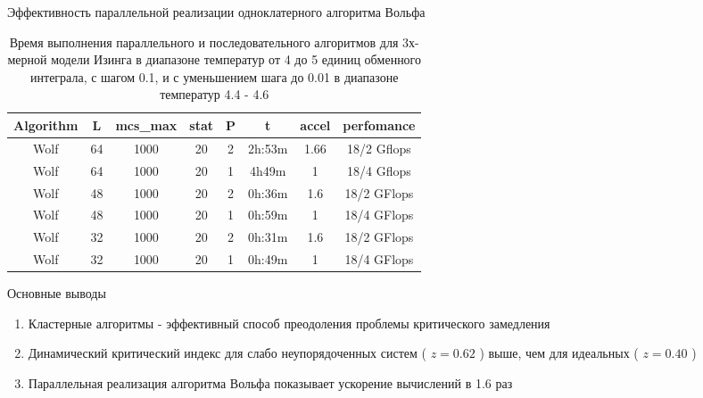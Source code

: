 \documentclass{beamer}
\begin{document}
\begin{frame}{Эффективность параллельной реализации одноклатерного алгоритма
Вольфа} \begin{table}[h]
\caption{Время выполнения параллельного и последовательного алгоритмов для
3х-мерной модели Изинга в диапазоне температур от 4 до 5 единиц обменного
интеграла, с шагом 0.1, и с уменьшением шага до 0.01 в диапазоне температур 4.4
- 4.6 }
\centering
    \label{tabular:comparetime}
	\begin{tabular}{|c|c|cccccc|}
	\hline
    Algorithm & L & mcs_{max} & stat & P & t & accel & perfomance \\
    \hline
    Wolf & 64 & 1000 & 20 & 2 & 2h:53m & 1.66  & 18/2 Gflops \\
    Wolf & 64 & 1000 & 20 & 1 & 4h49m  & 1  & 18/4 Gflops \\
    Wolf & 48 & 1000 & 20 & 2 & 0h:36m & 1.6  & 18/2 GFlops	\\
	Wolf & 48 & 1000 & 20 & 1 & 0h:59m & 1  & 18/4 GFlops\\
	Wolf & 32 & 1000 & 20 & 2 & 0h:31m & 1.6 & 18/2 GFlops\\
	Wolf & 32 & 1000 & 20 & 1 & 0h:49m & 1  & 18/4 GFlops\\
    \hline
\end{tabular}
\end{table}	
\end{frame}

\begin{frame}{Основные выводы}
\begin{enumerate}
  \item Кластерные алгоритмы - эффективный способ преодоления проблемы
  критического замедления
  \item Динамический критический индекс для слабо неупорядоченных систем ( $z =
  0.62$ ) выше, чем для идеальных ( $z = 0.40$ )
  \item Параллельная реализация алгоритма Вольфа показывает ускорение
  вычислений в 1.6 раз
\end{enumerate}
\end{frame}
\end{document}
